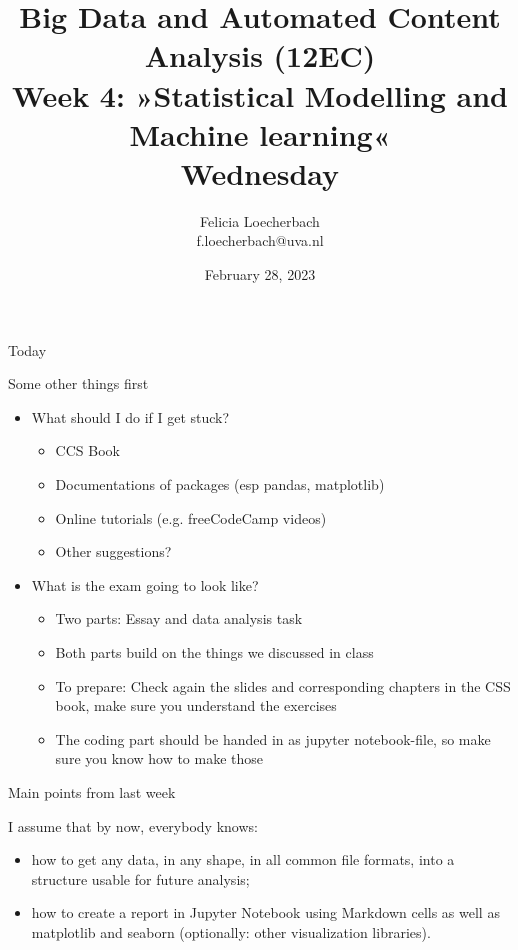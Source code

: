 \documentclass[compress]{beamer}
\begin{document}
\title[Big Data and Automated Content Analysis]{\textbf{Big Data and Automated Content Analysis (12EC)} 
\\Week 4: »Statistical Modelling and Machine learning«
\\Wednesday}
\author[Felicia Loecherbach]{Felicia Loecherbach\\ \footnotesize{f.loecherbach@uva.nl\\}}
\date{February 28, 2023}


\begin{frame}{}
	\titlepage
\end{frame}

\begin{frame}{Today}
	\tableofcontents
\end{frame}

\begin{frame}{Some other things first}
	\begin{itemize}
		\item What should I do if I get stuck? 
		\begin{itemize}
			\item CCS Book 
			\item Documentations of packages (esp pandas, matplotlib)
			\item Online tutorials (e.g. freeCodeCamp videos)
			\item Other suggestions? 
		\end{itemize}
		\item What is the exam going to look like? 
		\begin{itemize}
			\item Two parts: Essay and data analysis task
			\item Both parts build on the things we discussed in class
			\item To prepare: Check again the slides and corresponding chapters in the CSS book, make sure you understand the exercises
			\item The coding part should be handed in as jupyter notebook-file, so make sure you know how to make those
		\end{itemize} 
	\end{itemize}

\end{frame}




\begin{frame}{Main points from last week}

\begin{alertblock}{I assume that by now, everybody knows:}
\begin{itemize}
\item how to get any data, in any shape, in all common file formats, into a structure usable for future analysis;
\item how to create a report in Jupyter Notebook using Markdown cells as well as matplotlib and seaborn (optionally: other visualization libraries).
\end{itemize}
\end{alertblock}
\end{frame}
\end{document}
